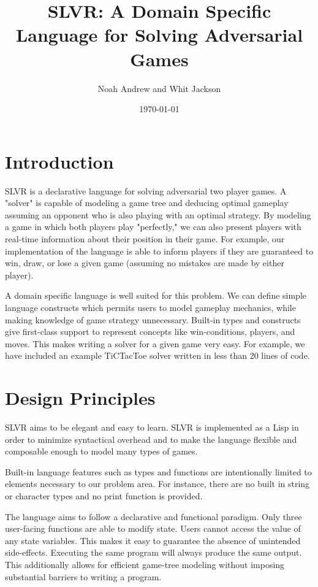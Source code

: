 \documentclass{article}
\title{SLVR: A Domain Specific Language for Solving Adversarial Games}
\author{Noah Andrew and Whit Jackson}
\date{\today}
\begin{document}
\maketitle

\section{Introduction}

SLVR is a declarative language for solving adversarial two player games. A "solver" is capable of modeling a game tree and deducing optimal gameplay assuming an opponent who is also playing with an optimal strategy. By modeling a game in which both players play "perfectly," we can also present players with real-time information about their position in their game. For example, our implementation of the language is able to inform players if they are guaranteed to win, draw, or lose a given game (assuming no mistakes are made by either player).

A domain specific language is well suited for this problem. We can define simple language constructs which permits users to   model gameplay mechanics, while making knowledge of game strategy unnecessary. Built-in types and constructs give first-class support to represent concepts like win-conditions, players, and moves. This makes writing a solver for a given game very easy. For example, we have included an example TiCTacToe solver written in less than 20 lines of code.


\section{Design Principles}

SLVR aims to be elegant and easy to learn. SLVR is implemented as a Lisp in order to minimize syntactical overhead and to make the language flexible and composable enough to model many types of games.

Built-in language features such as types and functions are intentionally limited to elements necessary to our problem area. For instance, there are no built in string or character types and no print function is provided.

The language aims to follow a declarative and functional paradigm. Only three user-facing functions are able to modify state. Users cannot access the value of any state variables. This makes it easy to guarantee the absence of unintended side-effects. Executing the same program will always produce the same output. This additionally allows for efficient game-tree modeling without imposing substantial barriers to writing a program.
\end{document}
